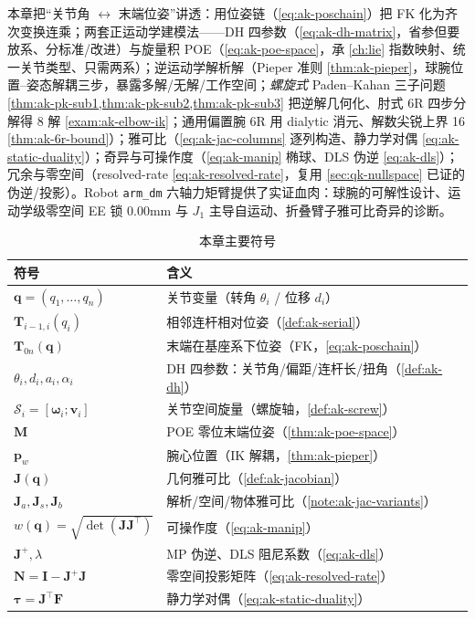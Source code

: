 本章把“关节角 $\leftrightarrow$ 末端位姿”讲透：用位姿链（\cref{eq:ak-poschain}）把 FK 化为齐次变换连乘；两套正运动学建模法——DH 四参数（\cref{eq:ak-dh-matrix}，省参但要放系、分标准/改进）与旋量积 POE（\cref{eq:ak-poe-space}，承 \cref{ch:lie} 指数映射、统一关节类型、只需两系）；逆运动学解析解（Pieper 准则 \cref{thm:ak-pieper}，球腕位置--姿态解耦三步，暴露多解/无解/工作空间；\emph{螺旋式} Paden--Kahan 三子问题 \cref{thm:ak-pk-sub1,thm:ak-pk-sub2,thm:ak-pk-sub3} 把逆解几何化、肘式 6R 四步分解得 8 解 \cref{exam:ak-elbow-ik}；通用偏置腕 6R 用 dialytic 消元、解数尖锐上界 16 \cref{thm:ak-6r-bound}）；雅可比（\cref{eq:ak-jac-columns} 逐列构造、静力学对偶 \cref{eq:ak-static-duality}）；奇异与可操作度（\cref{eq:ak-manip} 椭球、DLS 伪逆 \cref{eq:ak-dls}）；冗余与零空间（resolved-rate \cref{eq:ak-resolved-rate}，复用 \cref{sec:qk-nullspace} 已证的伪逆/投影）。Robot \texttt{arm\_dm} 六轴力矩臂提供了实证血肉：球腕的可解性设计、运动学级零空间 EE 锁 0.00mm 与 $J_1$ 主导自运动、折叠臂子雅可比奇异的诊断。

\begin{table}[H]\centering\small
\caption{本章主要符号}
\label{tab:ak-symbols}
\begin{tabular}{ll}
\toprule
符号 & 含义 \\
\midrule
$\mathbf{q}=(q_1,\dots,q_n)$ & 关节变量（转角 $\theta_i$ / 位移 $d_i$） \\
$\mathbf{T}_{i-1,i}(q_i)$ & 相邻连杆相对位姿（\cref{def:ak-serial}） \\
$\mathbf{T}_{0n}(\mathbf{q})$ & 末端在基座系下位姿（FK，\cref{eq:ak-poschain}） \\
$\theta_i,d_i,a_i,\alpha_i$ & DH 四参数：关节角/偏距/连杆长/扭角（\cref{def:ak-dh}） \\
$\mathcal{S}_i=[\boldsymbol{\omega}_i;\mathbf{v}_i]$ & 关节空间旋量（螺旋轴，\cref{def:ak-screw}） \\
$\mathbf{M}$ & POE 零位末端位姿（\cref{thm:ak-poe-space}） \\
$\mathbf{p}_w$ & 腕心位置（IK 解耦，\cref{thm:ak-pieper}） \\
$\mathbf{J}(\mathbf{q})$ & 几何雅可比（\cref{def:ak-jacobian}） \\
$\mathbf{J}_a,\mathbf{J}_s,\mathbf{J}_b$ & 解析/空间/物体雅可比（\cref{note:ak-jac-variants}） \\
$w(\mathbf{q})=\sqrt{\det(\mathbf{J}\mathbf{J}^\top)}$ & 可操作度（\cref{eq:ak-manip}） \\
$\mathbf{J}^{+},\lambda$ & MP 伪逆、DLS 阻尼系数（\cref{eq:ak-dls}） \\
$\mathbf{N}=\mathbf{I}-\mathbf{J}^{+}\mathbf{J}$ & 零空间投影矩阵（\cref{eq:ak-resolved-rate}） \\
$\boldsymbol{\tau}=\mathbf{J}^\top\mathbf{F}$ & 静力学对偶（\cref{eq:ak-static-duality}） \\
\bottomrule
\end{tabular}
\end{table}

